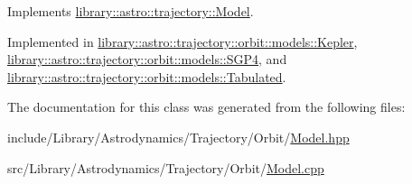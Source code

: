 Implements \hyperlink{classlibrary_1_1astro_1_1trajectory_1_1_model_af3dd0c38fdbac0b64f689fd8c88c3320}{library\+::astro\+::trajectory\+::\+Model}.



Implemented in \hyperlink{classlibrary_1_1astro_1_1trajectory_1_1orbit_1_1models_1_1_kepler_a5cecedfe1b2002881b4ef6eeae64af93}{library\+::astro\+::trajectory\+::orbit\+::models\+::\+Kepler}, \hyperlink{classlibrary_1_1astro_1_1trajectory_1_1orbit_1_1models_1_1_s_g_p4_aca7d5615c14d59338506fb13630cd535}{library\+::astro\+::trajectory\+::orbit\+::models\+::\+S\+G\+P4}, and \hyperlink{classlibrary_1_1astro_1_1trajectory_1_1orbit_1_1models_1_1_tabulated_a545a7209580a0c3863f37e2bdd925cb6}{library\+::astro\+::trajectory\+::orbit\+::models\+::\+Tabulated}.



The documentation for this class was generated from the following files\+:\begin{DoxyCompactItemize}
\item 
include/\+Library/\+Astrodynamics/\+Trajectory/\+Orbit/\hyperlink{_orbit_2_model_8hpp}{Model.\+hpp}\item 
src/\+Library/\+Astrodynamics/\+Trajectory/\+Orbit/\hyperlink{_orbit_2_model_8cpp}{Model.\+cpp}\end{DoxyCompactItemize}
